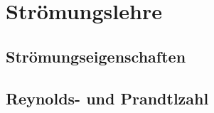 \section{Str\"{o}mungslehre}

\subsection{Str\"{o}mungseigenschaften}

\subsection{Reynolds- und Prandtlzahl}
